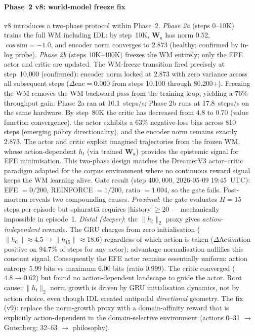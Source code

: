\documentclass[journal,onecolumn,11pt]{IEEEtran}
\begin{document}
\paragraph{Phase~2 v8: world-model freeze fix}
v8 introduces a two-phase protocol within Phase~2.
\emph{Phase 2a} (steps 0--10K) trains the full WM including IDL:
by step~10K, $\mathbf{W}_a$ has norm 0.52, $\cos\!\text{sim} = -1.0$,
and encoder norm converges to $2.873$ (healthy; confirmed by in-log probe).
\emph{Phase 2b} (steps 10K--400K) freezes the WM entirely; only the EFE actor
and critic are updated.
The WM-freeze transition fired precisely at step~10{,}000 (confirmed):
encoder norm locked at $\mathbf{2.873}$ with zero variance across all subsequent
steps ($\Delta\text{enc} = 0.000$ from steps 10{,}100 through 80{,}200+).
Freezing the WM removes the WM backward pass from the training loop, yielding a
$76\%$ throughput gain: Phase 2a ran at 10.1~steps/s; Phase 2b runs at
17.8~steps/s on the same hardware.
By step~80K the critic has decreased from 4.8 to 0.70 (value function
convergence), the actor exhibits a 63\% negative-loss bias across 810 steps
(emerging policy directionality), and the encoder norm remains exactly $2.873$.
The actor and critic exploit imagined trajectories from the frozen WM,
whose action-dependent $h_t$ (via trained $\mathbf{W}_a$) provides the epistemic
signal for EFE minimisation.
This two-phase design matches the DreamerV3 actor--critic paradigm adapted for the
corpus environment where no continuous reward signal keeps the WM learning alive.
Gate result (step $400{,}000$, 2026-05-09 19:45~UTC): EFE $= 0/200$,
REINFORCE $= 1/200$, ratio $= 1.004$, so the gate fails.
Post-mortem reveals two compounding causes.
\emph{Proximal}: the gate evaluates $H{=}15$ steps per episode but sphurattā
requires $|\text{history}| \ge 20$ — mechanically impossible in episode~1.
\emph{Distal (deeper)}: the $\|h_t\|_2$ proxy gives \emph{action-independent} rewards.
The GRU charges from zero initialisation ($\|h_0\|\!\approx\!4.5 \to \|h_{15}\|\!\approx\!18.6$)
regardless of which action is taken ($\Delta$Activation positive on 94.7\% of steps for any actor);
advantage normalisation nullifies this constant signal.
Consequently the EFE actor remains essentially uniform: action entropy
$5.99$ bits vs maximum $6.00$ bits (ratio 0.999).
The critic converged ($4.8 \to 0.62$) but found no action-dependent landscape to
guide the actor.
Root cause: $\|h_t\|_2$ norm growth is driven by GRU initialisation dynamics,
not by action choice, even though IDL created antipodal \emph{directional} geometry.
The fix (v9): replace the norm-growth proxy with a domain-affinity
reward that is explicitly action-dependent in the domain-selective environment
(actions 0--31 $\to$ Gutenberg; 32--63 $\to$ philosophy).
\end{document}
